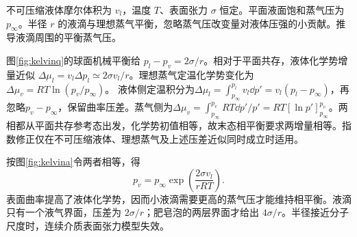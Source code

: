 \begin{exercise}[球面液滴与蒸气压的曲率修正（选做）]
不可压缩液体摩尔体积为 $v_l$，温度 $T$、表面张力 $\sigma$ 恒定。平面液面饱和蒸气压为 $p_\infty$。半径 $r$ 的液滴与理想蒸气平衡，忽略蒸气压改变量对液体压强的小贡献。推导液滴周围的平衡蒸气压。
\end{exercise}
\begin{solution}
图\ref{fig:kelvinq}的球面机械平衡给 $p_l-p_v=2\sigma/r$。相对于平面共存，液体化学势增量近似 $\Delta\mu_l=v_l\Delta p_l\simeq2\sigma v_l/r$。理想蒸气定温化学势变化为 $\Delta\mu_v=RT\ln(p_v/p_\infty)$。
液体侧定温积分为$\Delta\mu_l=\int_{p_\infty}^{p_l}v_l\dd p'=v_l(p_l-p_\infty)$，再忽略$p_v-p_\infty$，保留曲率压差。蒸气侧为$\Delta\mu_v=\int_{p_\infty}^{p_v}RT\dd p'/p'=RT[\ln p']_{p_\infty}^{p_v}$。两相都从平面共存参考态出发，化学势初值相等，故末态相平衡要求两增量相等。指数修正仅在不可压缩液体、理想蒸气及上述压差近似同时成立时适用。

按图\ref{fig:kelvina}令两者相等，得
\[
 p_v=p_\infty\exp\!\left(\frac{2\sigma v_l}{rRT}\right).
\]
表面曲率提高了液体化学势，因而小液滴需要更高的蒸气压才能维持相平衡。液滴只有一个液气界面，压差为 $2\sigma/r$；肥皂泡的两层界面才给出 $4\sigma/r$。半径接近分子尺度时，连续介质表面张力模型失效。
\end{solution}

